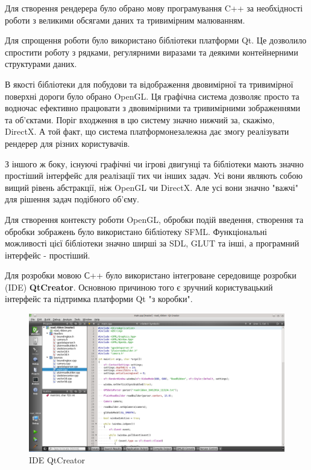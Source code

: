 \documentclass[simple,a4paper,14pt,ukrainian,utf8]{eskdtext}
\begin{document}
        Для створення рендерера було обрано мову програмування C++ за необхідності роботи з великими обсягами даних та тривимірним малюванням. 
        
        Для спрощення роботи було використано бібліотеки платформи Qt. Це дозволило спростити роботу з рядками, регулярними виразами та деякими контейнерними структурами даних.
        
        В якості бібліотеки для побудови та відображення двовимірної та тривимірної поверхні дороги було обрано OpenGL. Ця графічна система дозволяє просто та водночас ефективно працювати з двовимірними та тривимірними зображеннями та об’єктами. Поріг входження в цю систему значно нижчий за, скажімо, DirectX. А той факт, що система платформонезалежна дає змогу реалізувати рендерер для різних користувачів.
        
        З іншого ж боку, існуючі графічні чи ігрові двигунці та бібліотеки мають значно простіший інтерфейс для реалізації тих чи інших задач. Усі вони являють собою вищий рівень абстракції, ніж OpenGL чи DirectX. Але усі вони значно "важчі" для рішення задач подібного об’єму.
        
        Для створення контексту роботи OpenGL, обробки подій введення, створення та обробки зображень було використано бібліотеку SFML. Функціональні можливості цієї бібліотеки значно ширші за SDL, GLUT та інші, а програмний інтерфейс - простіший.
        
        Для розробки мовою С++ було використано інтегроване середовище розробки (IDE) \textbf{QtCreator}. Основною причиною того є зручний користувацький інтерфейс та підтримка платформи Qt "з коробки".
        
        \vspace{2em}
        \begin{figure}
        	\centering \includegraphics[scale=0.35]{images/qt_creator.png}
        	\caption{IDE QtCreator}
        \end{figure}
        
\end{document}
